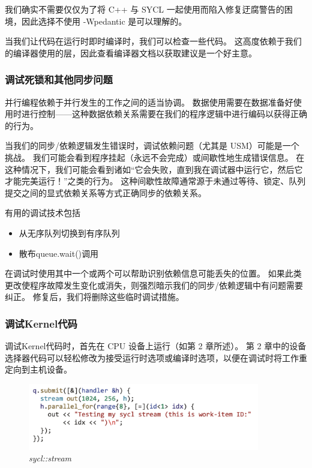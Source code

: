 我们确实不需要仅仅为了将 C++ 与 SYCL 一起使用而陷入修复迂腐警告的困境，因此选择不使用 -Wpedantic 是可以理解的。

当我们让代码在运行时即时编译时，我们可以检查一些代码。 
这高度依赖于我们的编译器使用的层，因此查看编译器文档以获取建议是一个好主意。

\subsubsection{调试死锁和其他同步问题}
并行编程依赖于并行发生的工作之间的适当协调。 
数据使用需要在数据准备好使用时进行控制——这种数据依赖关系需要在我们的程序逻辑中进行编码以获得正确的行为。

当我们的同步/依赖逻辑发生错误时，调试依赖问题（尤其是 USM）可能是一个挑战。 
我们可能会看到程序挂起（永远不会完成）或间歇性地生成错误信息。 
在这种情况下，我们可能会看到诸如“它会失败，直到我在调试器中运行它，然后它才能完美运行！”之类的行为。 
这种间歇性故障通常源于未通过等待、锁定、队列提交之间的显式依赖关系等方式正确同步的依赖关系。

有用的调试技术包括

\begin{itemize}
	\item 从无序队列切换到有序队列

	\item 散布queue.wait()调用
\end{itemize}

在调试时使用其中一个或两个可以帮助识别依赖信息可能丢失的位置。 
如果此类更改使程序故障发生变化或消失，则强烈暗示我们的同步/依赖逻辑中有问题需要纠正。 
修复后，我们将删除这些临时调试措施。

\subsubsection{调试Kernel代码}
调试Kernel代码时，首先在 CPU 设备上运行（如第 2 章所述）。 
第 2 章中的设备选择器代码可以轻松修改为接受运行时选项或编译时选项，以便在调试时将工作重定向到主机设备。

\begin{figure}[H]
	\centering
	\includegraphics[width=0.9\textwidth]{figs/F13.4.png}
	\caption{\textit{sycl::stream }}
\end{figure}

